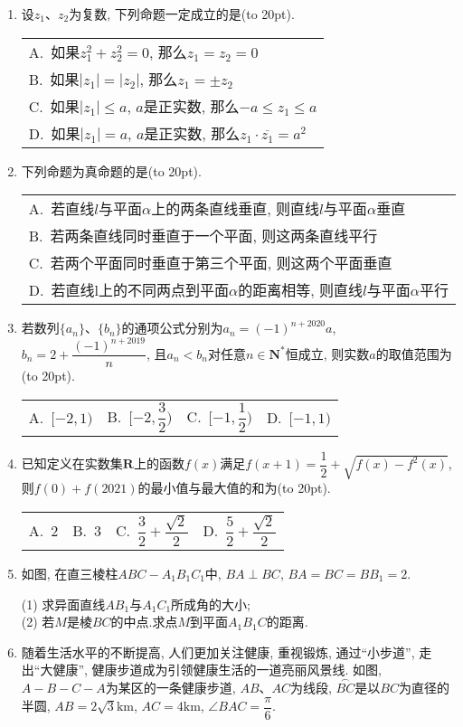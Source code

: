 \documentclass[10pt,a4paper]{article}
\newcommand{\bracket}[1]{(\hbox to #1pt{})}
\newcommand{\onech}[4]{\par\begin{tabular}{p{.9\textwidth}}
A.~#1\\
B.~#2\\
C.~#3\\
D.~#4
\end{tabular}}
\newcommand{\fourch}[4]{\par\begin{tabular}{p{.23\textwidth}p{.23\textwidth}p{.23\textwidth}p{.23\textwidth}}
A.~#1 &B.~#2& C.~#3& D.~#4
\end{tabular}}
\begin{document}
\begin{enumerate}[1.]
\item 设$z_1$、$z_2$为复数, 下列命题一定成立的是\bracket{20}.
\onech{如果$z_1^2+z_2^2=0$, 那么$z_1=z_2=0$}{如果$|z_1 |=|z_2 |$, 那么$z_1=\pm z_2$}{如果$|z_1 |\le a$, $a$是正实数, 那么$-a\le {z_1}\le a$}{如果$|z_1|=a$, $a$是正实数, 那么$z_1\cdot \overline{z_1}=a^2$}
\item 下列命题为真命题的是\bracket{20}.
\onech{若直线$l$与平面$\alpha$上的两条直线垂直, 则直线$l$与平面$\alpha$垂直}{若两条直线同时垂直于一个平面, 则这两条直线平行}{若两个平面同时垂直于第三个平面, 则这两个平面垂直}{若直线l上的不同两点到平面$\alpha$的距离相等, 则直线$l$与平面$\alpha$平行}
\item 若数列$\{a_n\}$、$\{b_n\}$的通项公式分别为$a_n=(-1)^{n+2020}a$, $b_n=2+\dfrac{{(-1)}^{n+2019}}n$, 且$a_n<b_n$对任意$n\in \mathbf{N}^*$恒成立, 则实数$a$的取值范围为\bracket{20}.
\fourch{$[-2,1)$}{$[-2,\dfrac 32)$}{$[-1,\dfrac 12)$}{$[-1,1)$}\item 已知定义在实数集$\mathbf{R}$上的函数$f(x)$满足$f(x+1)=\dfrac 12+\sqrt{f(x)-f^2(x)}$, 则$f(0)+f(2021)$的最小值与最大值的和为\bracket{20}.
\fourch{$2$}{$3$}{$\dfrac 32+\dfrac{\sqrt 2}2$}{$\dfrac 52+\dfrac{\sqrt 2}2$}
\item 如图, 在直三棱柱$ABC-A_1B_1C_1$中, $BA\perp BC$, $BA=BC=BB_1=2$.
\begin{center}
\end{center}
(1) 求异面直线$AB_1$与$A_1C_1$所成角的大小;\\
(2) 若$M$是棱$BC$的中点.求点$M$到平面$A_1{B_1}C$的距离.
\item 随着生活水平的不断提高, 人们更加关注健康, 重视锻炼, 通过``小步道'', 走出``大健康'', 健康步道成为引领健康生活的一道亮丽风景线. 如图, $A-B-C-A$为某区的一条健康步道, $AB$、$AC$为线段, $\overset\frown{BC}$是以$BC$为直径的半圆, $AB=2\sqrt 3\text{km}$, $AC=4\text{km}$, $\angle BAC=\dfrac{\pi}6$.
\begin{center}
    \begin{tikzpicture}[scale =0.7]

\end{tikzpicture}
\end{center}
\end{enumerate}
\end{document}
